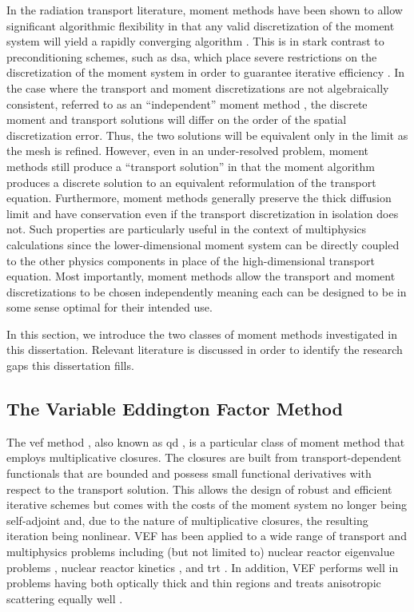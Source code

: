 \documentclass[../doc.tex]{subfiles}
\begin{document}
In the radiation transport literature, moment methods have been shown to allow significant algorithmic flexibility in that any valid discretization of the moment system will yield a rapidly converging algorithm \cite{two-level-independent-warsa}. 
This is in stark contrast to preconditioning schemes, such as \gls{dsa}, which place severe restrictions on the discretization of the moment system in order to guarantee iterative efficiency \cite{A}. In the case where the transport and moment discretizations are not algebraically consistent, referred to as an ``independent'' moment method \cite{doi:10.1080/00411459308203810,two-level-independent-warsa}, the discrete moment and transport solutions will differ on the order of the spatial discretization error. Thus, the two solutions will be equivalent only in the limit as the mesh is refined. However, even in an under-resolved problem, moment methods still produce a ``transport solution'' in that the moment algorithm produces a discrete solution to an equivalent reformulation of the transport equation. Furthermore, moment methods generally preserve the thick diffusion limit \cite{diflim} and have conservation even if the transport discretization in isolation does not. Such properties are particularly useful in the context of multiphysics calculations since the lower-dimensional moment system can be directly coupled to the other physics components in place of the high-dimensional transport equation. Most importantly, moment methods allow the transport and moment discretizations to be chosen independently meaning each can be designed to be in some sense optimal for their intended use. 

In this section, we introduce the two classes of moment methods investigated in this dissertation. Relevant literature is discussed in order to identify the research gaps this dissertation fills. 

\subsection{The Variable Eddington Factor Method}
The \gls{vef} method \cite{mihalas,auer_vef}, also known as \gls{qd} \cite{goldin}, is a particular class of moment method that employs multiplicative closures. 
The closures are built from transport-dependent functionals that are bounded and possess small functional derivatives with respect to the transport solution. This allows the design of robust and efficient iterative schemes but comes with the costs of the moment system no longer being self-adjoint and, due to the nature of multiplicative closures, the resulting iteration being nonlinear. 
VEF has been applied to a wide range of transport and multiphysics problems including (but not limited to) nuclear reactor eigenvalue problems \cite{airstova_eigenvalue}, nuclear reactor kinetics \cite{doi:10.13182/NSE13-42}, and \gls{trt} \cite{anistratov1996nonlinear}. In addition, VEF performs well in problems having both optically thick and thin regions and treats anisotropic scattering equally well \cite{anistratov_fvm,ARISTOVA2000139}. 
\end{document}
